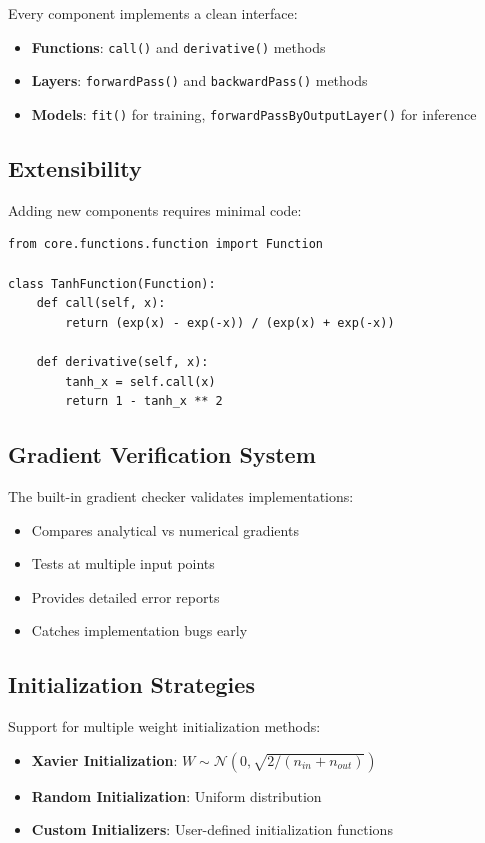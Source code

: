 \documentclass[12pt,a4paper]{article}
\begin{document}
Every component implements a clean interface:
\begin{itemize}
    \item \textbf{Functions}: \texttt{call()} and \texttt{derivative()} methods
    \item \textbf{Layers}: \texttt{forwardPass()} and \texttt{backwardPass()} methods
    \item \textbf{Models}: \texttt{fit()} for training, \texttt{forwardPassByOutputLayer()} for inference
\end{itemize}

\subsection{Extensibility}

Adding new components requires minimal code:

\begin{lstlisting}[caption={Adding a custom activation function}]
from core.functions.function import Function

class TanhFunction(Function):
    def call(self, x):
        return (exp(x) - exp(-x)) / (exp(x) + exp(-x))
    
    def derivative(self, x):
        tanh_x = self.call(x)
        return 1 - tanh_x ** 2
\end{lstlisting}

\subsection{Gradient Verification System}

The built-in gradient checker validates implementations:
\begin{itemize}
    \item Compares analytical vs numerical gradients
    \item Tests at multiple input points
    \item Provides detailed error reports
    \item Catches implementation bugs early
\end{itemize}

\subsection{Initialization Strategies}

Support for multiple weight initialization methods:
\begin{itemize}
    \item \textbf{Xavier Initialization}: $W \sim \mathcal{N}(0, \sqrt{2/(n_{in} + n_{out})})$
    \item \textbf{Random Initialization}: Uniform distribution
    \item \textbf{Custom Initializers}: User-defined initialization functions
\end{itemize}
\end{document}
